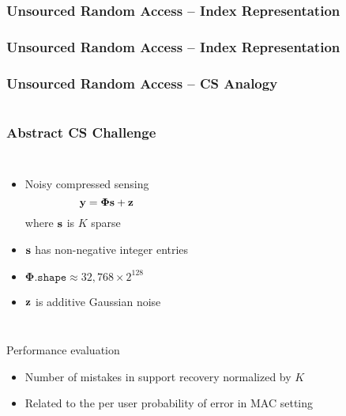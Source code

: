\begin{frame} \frametitle{Unsourced Random Access -- Index Representation}
\begin{center}  \end{center}
\end{frame}


\begin{frame} \frametitle{Unsourced Random Access -- Index Representation}
\begin{center}  \end{center}
\end{frame}


\begin{frame}
\frametitle{Unsourced Random Access -- CS Analogy}
\hfill
\scalebox{0.75}{}
\vspace{-2cm}
\begin{columns}
\scalebox{0.8}{}
\end{columns}
\end{frame}


\begin{frame}
\frametitle{Abstract CS Challenge}
\begin{columns}
  \begin{itemize}
  \item Noisy compressed sensing
  \begin{equation*}
  \mathbf{y} = \boldsymbol{\Phi} \mathbf{s} + \mathbf{z}
  \end{equation*}
  where $\mathbf{s}$ is $K$ sparse
  \item $\mathbf{s}$ has non-negative integer entries
  \item $\boldsymbol{\Phi}.\mathtt{shape} \approx 32,768 \times 2^{128}$
  \item $\mathbf{z}$ is additive Gaussian noise
  \end{itemize}
  \hspace{-1cm} \scalebox{0.75}{}
\end{columns}
\vfill
\begin{block}{Performance evaluation}
  \begin{itemize}
  \item Number of mistakes in support recovery normalized by $K$
  \item Related to the per user probability of error in MAC setting
  \end{itemize}
\end{block}
\end{frame}

